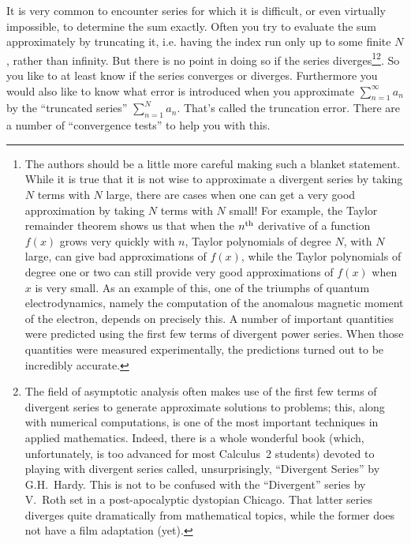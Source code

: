 It is very common to encounter series for which it is difficult, or even
virtually impossible, to determine the sum exactly. Often you try to evaluate
the sum approximately by truncating it, i.e. having the index run only
up to some finite $N$, rather than infinity. But there is no point in doing
so if the series diverges\footnote{
The authors should be a little more careful making such a blanket statement. While it is true that it is not wise to approximate a divergent series by taking \(N\) terms with \(N\) large, there are cases when one can get a very good approximation by taking \(N\) terms with \(N\) small! For example, the Taylor remainder theorem shows us that when the \(n^{\rm th}\) derivative of a function \(f(x)\) grows very quickly with \(n\), Taylor polynomials of degree \(N\), with \(N\) large, can give bad approximations of \(f(x)\), while the Taylor polynomials of degree one or two can still provide very good approximations of \(f(x)\) when \(x\) is very small. As an example of this, one of the triumphs of quantum electrodynamics, namely the computation of the anomalous magnetic moment of the electron, depends on precisely this. A number of important quantities were predicted using the first few terms of divergent power series. When those quantities were measured experimentally, the predictions turned out to be incredibly accurate.
}\footnote{
The field of asymptotic analysis often makes use of the first few terms of divergent series to generate approximate solutions to problems; this, along with numerical computations, is one of the most important techniques in applied mathematics. Indeed, there is a whole wonderful book  (which, unfortunately, is too advanced for most Calculus~2 students) devoted to playing with divergent series called, unsurprisingly, ``Divergent Series'' by G.H.~Hardy. This is not to be confused with the ``Divergent'' series by V.~Roth set in a post-apocalyptic dystopian Chicago. That latter series diverges quite dramatically from mathematical topics, while the former does not have a film adaptation (yet).
}. So you like to at least know if the series converges
or diverges. Furthermore you would also like to know what error is introduced
when you approximate $\sum_{n=1}^\infty a_n$ by the ``truncated series''
$\sum_{n=1}^Na_n$. That's called the truncation error. There are a number
of ``convergence tests'' to help you with this.

